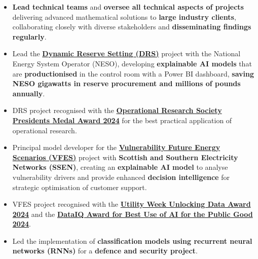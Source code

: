 \documentclass{my_cv}
\begin{document}
%
    {\begin{itemize}[topsep=0pt,itemsep=0pt,partopsep=0pt, parsep=0pt] 
\item \textbf{Lead technical teams} and \textbf{oversee all technical aspects of projects} delivering advanced mathematical solutions to \textbf{large industry clients}, collaborating closely with diverse stakeholders and \textbf{disseminating findings regularly}.
  \item Lead the \textbf{\href{https://www.neso.energy/news/dynamic-reserve-setting-innovation-project-seeks-reduce-balancing-costs}{Dynamic Reserve Setting (DRS)}} project with the National Energy System Operator (NESO), developing \textbf{explainable AI models} that are \textbf{productionised} in the control room with a Power BI dashboard, \textbf{saving NESO gigawatts in reserve procurement and millions of pounds annually}.
  \item DRS project recognised with the \textbf{\href{https://www.theorsociety.com/ORS/ORS/About-OR/News/Presidents-Medal-award.aspx}{Operational Research Society Presidents Medal Award 2024}} for the best practical application of operational research.
\item Principal model developer for the \textbf{\href{https://ssen-innovation.co.uk/nia-projects/vfes/}{Vulnerability Future Energy Scenarios (VFES)}} project with \textbf{Scottish and Southern Electricity Networks (SSEN)}, creating an \textbf{explainable AI model} to analyse vulnerability drivers and provide enhanced \textbf{decision intelligence} for strategic optimisation of customer support.
  \item VFES project recognised with the \textbf{\href{https://www.ssen.co.uk/news-views/2024/SSENs-innovative-net-zero-programmes-win-big-at-the-2024-Utility-Week-awards/}{Utility Week Unlocking Data Award 2024}} and the \textbf{\href{https://www.dataiq.global/award-winner/2024-dataiq-awards-best-use-of-ai-for-the-public-good/}{DataIQ Award for Best Use of AI for the Public Good 2024}}.
  \item Led the implementation of \textbf{classification models using recurrent neural networks (RNNs)} for a \textbf{defence and security project}.
    \end{itemize}
    }%
\end{document}
